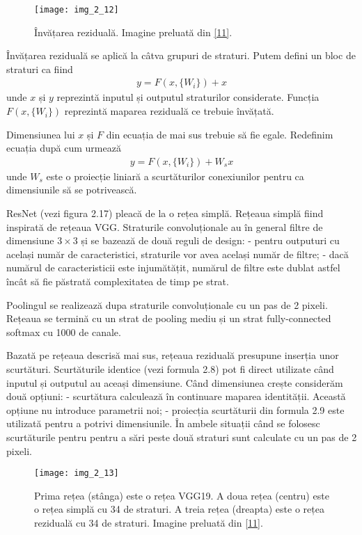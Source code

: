 \begin{figure}[!h]
	\centering
	\texttt{[image: img\_2\_12]}
	\caption[Învățarea reziduală]{Învățarea reziduală. Imagine preluată din \hyperlink{KaimingHeXiangyuZhangShaoqingRenJianSun}{[11]}.}
\end{figure}  

Învățarea reziduală se aplică la câtva grupuri de straturi. Putem defini un bloc de straturi ca fiind 
\begin{align}
	y = F(x,\{W_i\}) + x
\end{align}
unde $x$ și $y$ reprezintă inputul și outputul straturilor considerate. Funcția $F(x, \{W_i\})$ reprezintă maparea reziduală ce trebuie învățată.

Dimensiunea lui $x$ și $F$ din ecuația de mai sus trebuie să fie egale. Redefinim ecuația după cum urmează
\begin{align}
	y = F(x,\{W_i\}) + W_sx
\end{align}
unde $W_s$ este o proiecție liniară a scurtăturilor conexiunilor pentru ca dimensiunile să se potrivească.

ResNet (vezi figura 2.17) pleacă de la o rețea simplă. Rețeaua simplă fiind inspirată de rețeaua VGG. Straturile convoluționale au în general filtre de dimensiune $3 \times 3$ și se bazează de două reguli de design: - pentru outputuri cu același număr de caracteristici, straturile vor avea același număr de filtre; - dacă numărul de caracteristicii este injumătățit, numărul de filtre este dublat astfel încât să fie păstrată complexitatea de timp pe strat.

Poolingul se realizează dupa straturile convoluționale cu un pas de 2 pixeli. Rețeaua se termină cu un strat de pooling mediu și un strat fully-connected softmax cu 1000 de canale.

Bazată pe rețeaua descrisă mai sus, rețeaua reziduală presupune inserția unor scurtături. Scurtăturile identice (vezi formula 2.8) pot fi direct utilizate când inputul și outputul au aceași dimensiune. Când dimensiunea crește considerăm două opțiuni: - scurtătura calculează în continuare maparea identității. Această opțiune nu introduce parametrii noi; - proiecția scurtăturii din formula 2.9 este utilizată pentru a potrivi dimensiunile. În ambele situații când se folosesc scurtăturile pentru pentru a sări peste două straturi sunt calculate cu un pas de 2 pixeli.

\begin{figure}[!h]
	\centering
	\texttt{[image: img\_2\_13]}
	\caption[Rețeaua ResNet]{Prima rețea (stânga) este o rețea VGG19. A doua rețea (centru) este o rețea simplă cu 34 de straturi. A treia rețea (dreapta) este o rețea reziduală cu 34 de straturi. Imagine preluată din \hyperlink{KaimingHeXiangyuZhangShaoqingRenJianSun}{[11]}.}
\end{figure}  

